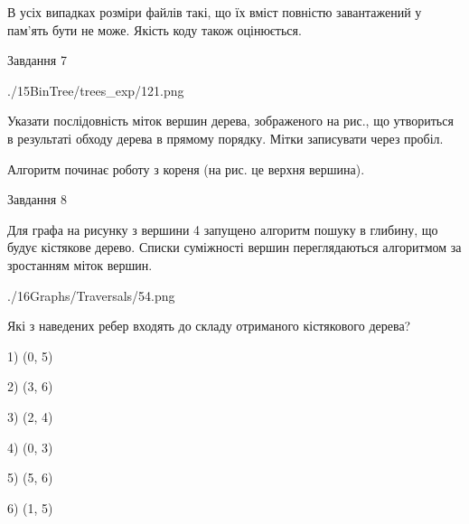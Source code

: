 \documentclass[12pt, ukrainian]{article}
\begin{document}
{В усіх випадках розміри файлів такі, що їх вміст повністю завантажений у пам'ять бути не може. Якість коду також оцінюється.



\vspace{10mm}\par

\newpage
\begin{minipage}[t]{9.7cm}
               
{\begin{center}Завдання {7}\end{center}}
\vspace{-6mm}

\begin{center}
	{./15BinTree/trees_exp/121.png}
\end{center}
Указати послідовність міток вершин дерева, зображеного на рис., що утвориться в результаті обходу дерева в прямому порядку. Мітки записувати через пробіл.\par Алгоритм починає роботу з кореня (на рис. це верхня вершина).\par

\end{minipage}
\vline \hspace{8mm}
\begin{minipage}[t]{8.0cm}
               
{\begin{center}Завдання {8}\end{center}}
\vspace{-6mm}
Для графа на рисунку з вершини 4 запущено алгоритм пошуку в глибину, що будує кістякове дерево. Списки суміжності вершин переглядаються алгоритмом за зростанням міток вершин.\par
\begin{center}
	{./16Graphs/Traversals/54.png}
\end{center}
\par Які з наведених ребер входять до складу отриманого кістякового дерева?\par
1) (0, 5)\par
2) (3, 6)\par
3) (2, 4)\par
4) (0, 3)\par
5) (5, 6)\par
6) (1, 5)\par
{\vskip 15pt} \par


\end{minipage}}
\end{document}
